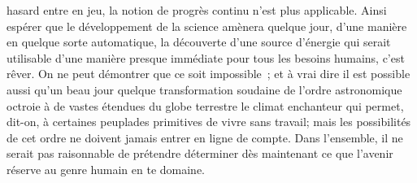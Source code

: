 \documentclass[french,twoside]{book} %
\begin{document}
hasard entre en jeu, la notion de progrès continu n'est plus applicable. Ainsi espérer que le développement de la science amènera quelque jour, d'une manière en quelque sorte automatique, la découverte d'une source d'énergie qui serait utilisable d'une manière presque immédiate pour tous les besoins humains, c'est rêver. On ne peut démontrer que ce soit impossible ; et à vrai dire il est possible aussi qu'un beau jour quelque transformation soudaine de l'ordre astronomique octroie à de vastes étendues du globe terrestre le climat enchanteur qui permet, dit-on, à certaines peuplades primitives de vivre sans travail; mais les possibilités de cet ordre ne doivent jamais entrer en ligne de compte. Dans l'ensemble, il ne serait pas raisonnable de prétendre déterminer dès maintenant ce que l'avenir réserve au genre humain en te domaine.\par
\end{document}
